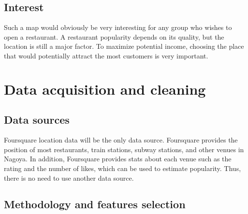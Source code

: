 \documentclass[12pt,a4paper]{article}
\begin{document}
\subsection{Interest}

Such a map would obviously be very interesting for any group who wishes to open a restaurant. A restaurant popularity depends on its quality, but the location is still a major factor. To maximize potential income, choosing the place that would potentially attract the most customers is very important.

\section{Data acquisition and cleaning}

\subsection{Data sources}

Foursquare location data will be the only data source. Foursquare provides the position of most restaurants, train stations, subway stations, and other venues in Nagoya. In addition, Foursquare provides stats about each venue such as the rating and the number of likes, which can be used to estimate popularity. Thus, there is no need to use another data source.

\subsection{Methodology and features selection}
\end{document}

